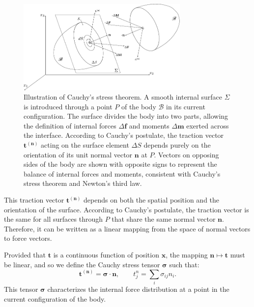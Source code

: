 \documentclass[a4paper,11pt]{article}
\begin{document}
\begin{figure}[H]
\centering
\includegraphics[width=0.75\textwidth]{images/cauchy.pdf}
\caption{Illustration of Cauchy's stress theorem. A smooth internal surface $\Sigma$ is introduced through a point $P$ of the body $\mathscr{B}$ in its current configuration. The surface divides the body into two parts, allowing the definition of internal forces $\Delta \mathbf{f}$ and moments $\Delta \mathbf{m}$ exerted across the interface. According to Cauchy's postulate, the traction vector $\mathbf{t}^{(\mathbf{n})}$ acting on the surface element $\Delta S$ depends purely on the orientation of its unit normal vector $\mathbf{n}$ at $P$. Vectors on opposing sides of the body are shown with opposite signs to represent the balance of internal forces and moments, consistent with Cauchy's stress theorem and Newton's third law.} 
\label{fig:cauchy}
\end{figure}

This traction vector $\mathbf{t}^{(\mathbf{n})}$ depends on both the spatial position and the orientation of the surface. According to Cauchy's postulate, the traction vector is the same for all surfaces through $P$ that share the same normal vector $\mathbf{n}$. Therefore, it can be written as a linear mapping from the space of normal vectors to force vectors.

Provided that $\mathbf{t}$ is a continuous function of position $\mathbf{x}$, the mapping $\mathbf{n} \mapsto \mathbf{t}$ must be linear, and so we define the Cauchy stress tensor $\boldsymbol{\sigma}$ such that:
\begin{equation}
\mathbf{t}^{(\mathbf{n})} = \boldsymbol{\sigma} \cdot \mathbf{n}, \qquad t_j^n = \sum_i \sigma_{ij}n_i.
\end{equation}
This tensor $\boldsymbol{\sigma}$ characterizes the internal force distribution at a point in the current configuration of the body.
\end{document}
